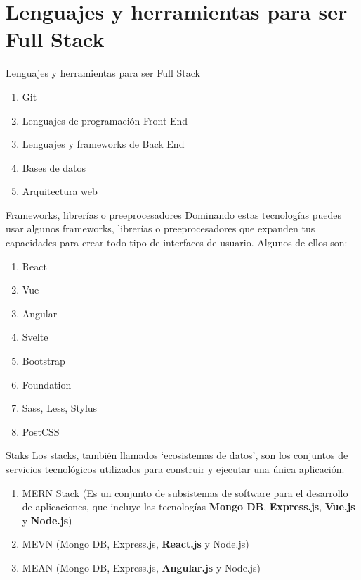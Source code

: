 \documentclass[11pt]{beamer}
\begin{document}
\section{Lenguajes y herramientas para ser Full Stack}
\begin{frame}{Lenguajes y herramientas para ser Full Stack}
	\begin{enumerate}
		\item Git
		\item Lenguajes de programación Front End
		\item Lenguajes y frameworks de Back End
		\item Bases de datos
		\item Arquitectura web
	\end{enumerate}
\end{frame}

\begin{frame}{Frameworks, librerías o preeprocesadores}
	Dominando estas tecnologías puedes usar algunos frameworks, librerías o preeprocesadores que expanden tus capacidades para crear todo tipo de interfaces de usuario. Algunos de ellos son:
	\begin{enumerate}
\item 	React
	\item Vue
	\item Angular
	\item Svelte
	\item Bootstrap
 	\item Foundation
	\item Sass, Less, Stylus
	\item PostCSS
	\end{enumerate}


\end{frame}

\begin{frame}{Staks}
	Los stacks, también llamados ‘ecosistemas de datos’, son los conjuntos de servicios tecnológicos utilizados para construir y ejecutar una única aplicación. 
	\begin{enumerate}
		\item MERN Stack (Es un conjunto de subsistemas de software para el desarrollo de aplicaciones, que incluye las tecnologías \textbf{Mongo DB}, \textbf{Express.js}, \textbf{Vue.js} y \textbf{Node.js})
		\item MEVN ({Mongo DB}, {Express.js}, \textbf{React.js} y {Node.js})
		\item MEAN ({Mongo DB}, {Express.js}, \textbf{Angular.js} y {Node.js})
	\end{enumerate}
\end{frame}
\end{document}
